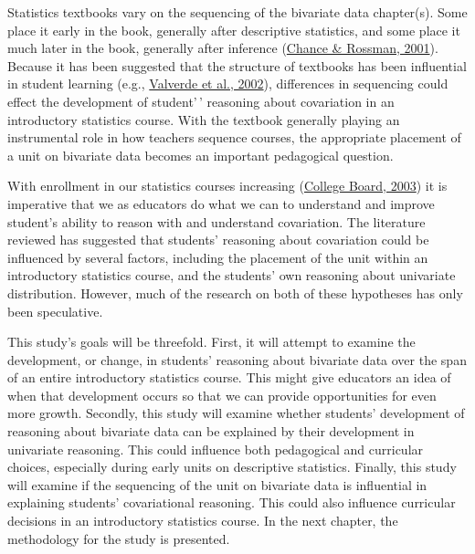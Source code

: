 \documentclass[11pt]{umnthesis}
\begin{document}
Statistics textbooks vary on the sequencing of the bivariate data chapter(s). Some place it early in the book, generally after descriptive statistics, and some place it much later in the book, generally after inference (\protect\hyperlink{ref-chance:2001}{Chance \& Rossman, 2001}). Because it has been suggested that the structure of textbooks has been influential in student learning (e.g., \protect\hyperlink{ref-valverde:2002}{Valverde et al., 2002}), differences in sequencing could effect the development of student'\,' reasoning about covariation in an introductory statistics course. With the textbook generally playing an instrumental role in how teachers sequence courses, the appropriate placement of a unit on bivariate data becomes an important pedagogical question.

With enrollment in our statistics courses increasing (\protect\hyperlink{ref-college-board:2003}{College Board, 2003}) it is imperative that we as educators do what we can to understand and improve student's ability to reason with and understand covariation. The literature reviewed has suggested that students' reasoning about covariation could be influenced by several factors, including the placement of the unit within an introductory statistics course, and the students' own reasoning about univariate distribution. However, much of the research on both of these hypotheses has only been speculative.

This study's goals will be threefold. First, it will attempt to examine the development, or change, in students' reasoning about bivariate data over the span of an entire introductory statistics course. This might give educators an idea of when that development occurs so that we can provide opportunities for even more growth. Secondly, this study will examine whether students' development of reasoning about bivariate data can be explained by their development in univariate reasoning. This could influence both pedagogical and curricular choices, especially during early units on descriptive statistics. Finally, this study will examine if the sequencing of the unit on bivariate data is influential in explaining students' covariational reasoning. This could also influence curricular decisions in an introductory statistics course. In the next chapter, the methodology for the study is presented.
\end{document}
